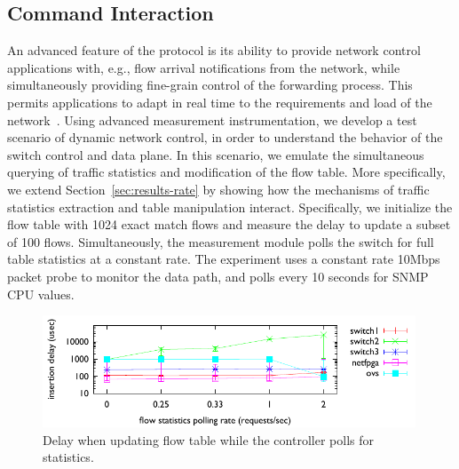 \subsection{\of Command Interaction}\label{sec:results-interactions}


An advanced feature of the \of protocol is its ability to provide network
control applications with, e.g., flow arrival notifications from the network,
while simultaneously providing fine-grain control of the forwarding process.
This permits applications to adapt in real time to the requirements and load of
the network~\cite{plug_n_serv,Yap09}. Using \oflops advanced measurement
instrumentation, we develop a test scenario of dynamic network control, in order
to understand the behavior of the switch control and data plane.  In this
scenario, we emulate the simultaneous querying of traffic statistics and
modification of the flow table.  More specifically, we extend
Section~\ref{sec:results-rate} by showing how the mechanisms of traffic
statistics extraction and table manipulation interact. Specifically, we
initialize the flow table with 1024 exact match flows and measure the delay to
update a subset of 100 flows.  Simultaneously, the measurement module polls the
switch for full table statistics at a constant rate. The experiment uses a
constant rate 10Mbps packet probe to monitor the data path, and polls every 10
seconds for SNMP CPU values.

\begin{figure}[t]
  \begin{center}
    \includegraphics[width=0.99\textwidth]{interaction_test}
  \end{center}
  \caption{Delay when updating  flow table while the controller polls
    for statistics.}
  \label{fig:interaction_test}
\end{figure}

